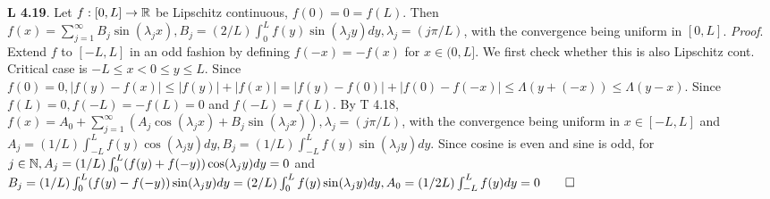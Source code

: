 {\bf L 4.19}. Let $f: [0,L]\rightarrow \mathbb{R}$ be Lipschitz continuous, $f(0)=0=f(L)$. Then $f(x)=\sum_{j=1}^{\infty}B_j\sin(\lambda_jx), B_j=(2/L)\int_0^Lf(y)\sin(\lambda_jy)dy, \lambda_j = (j \pi/L)$, with the convergence being uniform in $[0,L]$. {\it Proof}. Extend $f$ to $[-L,L]$ in an odd fashion by defining $f(-x)=-f(x)$ for $x \in (0,L]$. We first check whether this is also Lipschitz cont. Critical case is $-L \leq x <0 \leq y \leq L$. Since $f(0)=0, |f(y)-f(x)| \leq |f(y)| + |f(x)|=|f(y)-f(0)|+|f(0)-f(-x)|\leq \Lambda(y+(-x)) \leq \Lambda (y-x)$. Since $f(L)=0, f(-L)=-f(L)=0$ and $f(-L)=f(L)$. By T 4.18, $f(x)=A_0+\sum_{j=1}^{\infty}(A_j\cos(\lambda_jx) + B_j \sin(\lambda_jx)), \lambda_j=(j\pi/L)$, with the convergence being uniform in $x \in [-L,L]$ and $A_j=(1/L)\int_{-L}^L f(y)\cos(\lambda_jy)dy, B_j=(1/L)\int_{-L}^L f(y)\sin(\lambda_jy)dy$. Since cosine is even and sine is odd, for $j \in \mathbb{N}, A_j=(1/L)\int_0^L( f(y)+f(-y))\cos(\lambda_jy)dy=0$ and $B_j=(1/L)\int_0^L (f(y)-f(-y))\sin(\lambda_jy)dy=(2/L)\int_0^L f(y)\sin(\lambda_jy)dy, A_0=(1/2L)\int_{-L}^L f(y)dy=0 \qed$
